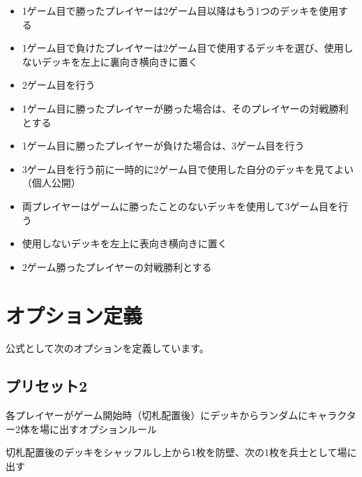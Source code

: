 \documentclass[letterpaper,10pt,dvipdfmx]{sphinxmanual}
\begin{document}
\begin{description}
\begin{itemize}
\item {} 
\sphinxAtStartPar
1ゲーム目で勝ったプレイヤーは2ゲーム目以降はもう1つのデッキを使用する

\item {} 
\sphinxAtStartPar
1ゲーム目で負けたプレイヤーは2ゲーム目で使用するデッキを選び、使用しないデッキを左上に裏向き横向きに置く

\item {} 
\sphinxAtStartPar
2ゲーム目を行う

\item {} 
\sphinxAtStartPar
1ゲーム目に勝ったプレイヤーが勝った場合は、そのプレイヤーの対戦勝利とする

\item {} 
\sphinxAtStartPar
1ゲーム目に勝ったプレイヤーが負けた場合は、3ゲーム目を行う

\item {} 
\sphinxAtStartPar
3ゲーム目を行う前に一時的に2ゲーム目で使用した自分のデッキを見てよい（個人公開）

\item {} 
\sphinxAtStartPar
両プレイヤーはゲームに勝ったことのないデッキを使用して3ゲーム目を行う

\item {} 
\sphinxAtStartPar
使用しないデッキを左上に表向き横向きに置く

\item {} 
\sphinxAtStartPar
2ゲーム勝ったプレイヤーの対戦勝利とする

\end{itemize}

\end{description}


\section{オプション定義}
\label{\detokenize{match-regulations/match-regulations:id8}}
\sphinxAtStartPar
公式として次のオプションを定義しています。


\subsection{プリセット2}
\label{\detokenize{match-regulations/match-regulations:id9}}
\sphinxAtStartPar
各プレイヤーがゲーム開始時（切札配置後）にデッキからランダムにキャラクター2体を場に出すオプションルール

\sphinxAtStartPar
切札配置後のデッキをシャッフルし上から1枚を防壁、次の1枚を兵士として場に出す
\end{document}
